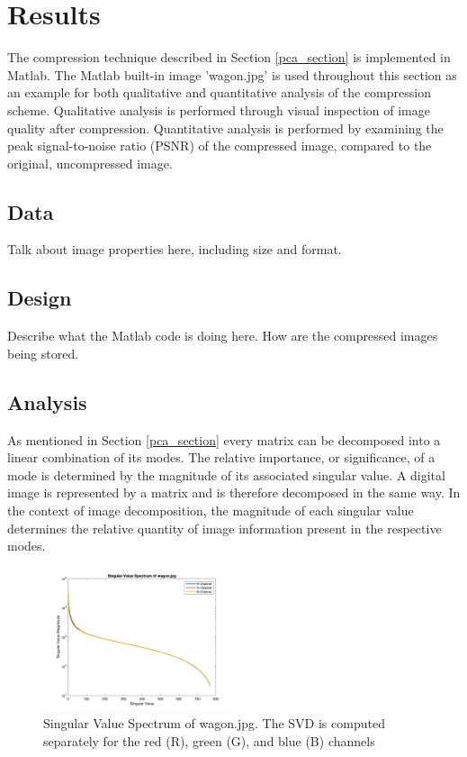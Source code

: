 \documentclass[conference]{IEEEtran}
\begin{document}
    \section{Results}

    The compression technique described in Section \ref{pca_section} is implemented in Matlab. The Matlab built-in image 'wagon.jpg' is used throughout this section as an example for both qualitative and quantitative analysis of the compression scheme. Qualitative analysis is performed through visual inspection of image quality after compression. Quantitative analysis is performed by examining the peak signal-to-noise ratio (PSNR) of the compressed image, compared to the original, uncompressed image.

    \subsection{Data}
    Talk about image properties here, including size and format.

    \subsection{Design}
    Describe what the Matlab code is doing here.
    How are the compressed images being stored.

    \subsection{Analysis}
    As mentioned in Section \ref{pca_section} every matrix can be decomposed into a linear combination of its modes. The relative importance, or significance, of a mode is determined by the magnitude of its associated singular value. A digital image is represented by a matrix and is therefore decomposed in the same way. In the context of image decomposition, the magnitude of each singular value determines the relative quantity of image information present in the respective modes.

    \begin{figure}[t]
    \includegraphics[width=0.5\textwidth]{svals_wagon_rgb}
    \caption{Singular Value Spectrum of wagon.jpg. The SVD is computed separately for the red (R), green (G), and blue (B) channels}
    \label{fig:svalplot}
    \end{figure}
    
\end{document}
